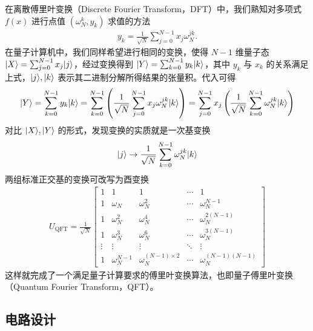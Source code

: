 \documentclass[a4paper,11pt,onecolumn,twoside]{article}
\begin{document}
在离散傅里叶变换（Discrete Fourier Transform，DFT）中，我们熟知对多项式 $f(x)$ 进行点值 $(\omega_N^k,y_k)$ 求值的方法 \begin{align}
    y_k=\frac{1}{\sqrt{N}}\sum_{j=0}^{N-1}x_j\omega_N^{jk}.
\end{align}
在量子计算机中，我们同样希望进行相同的变换，使得 $N-1$ 维量子态 $|X\rangle=\sum_{j=0}^{N-1}x_j|j\rangle$，经过变换得到 $|Y\rangle=\sum_{k=0}^{N-1}y_k|k\rangle$，其中 $y_k$ 与 $x_k$ 的关系满足上式，$|j\rangle,|k\rangle$ 表示其二进制分解所得结果的张量积。代入可得 \begin{align}
    |Y\rangle=\sum_{k=0}^{N-1}y_k|k\rangle=\sum_{k=0}^{N-1}\left(\frac{1}{\sqrt{N}}\sum_{j=0}^{N-1}x_j\omega_N^{jk}|k\rangle\right)=\sum_{j=0}^{N-1}x_j\left(\frac{1}{\sqrt{N}}\sum_{k=0}^{N-1}\omega_N^{jk}|k\rangle\right)
\end{align}
对比 $|X\rangle,|Y\rangle$ 的形式，发现变换的实质就是一次基变换 \begin{align}
    |j\rangle\to\frac{1}{\sqrt{N}}\sum_{k=0}^{N-1}\omega_N^{jk}|k\rangle\label{eq:qft-change-basis}
\end{align}
两组标准正交基的变换可改写为酉变换 \begin{align}
    U_{\text{QFT}} = \frac{1}{\sqrt{N}}
    \begin{bmatrix}
        1      & 1               & 1                         & \cdots & 1                      \\
        1      & \omega_N        & \omega_N ^{2}             & \cdots & \omega_N ^{N-1}        \\
        1      & \omega_N ^{2}   & \omega_N ^{4}             & \cdots & \omega_N ^{2(N-1)}     \\
        1      & \omega_N ^{3}   & \omega_N ^{6}             & \cdots & \omega_N ^{3(N-1)}     \\
        \vdots & \vdots          & \vdots                    & \ddots & \vdots                 \\
        1      & \omega_N ^{N-1} & \omega_N ^{(N-1)\times 2} & \cdots & \omega_N ^{(N-1)(N-1)}
    \end{bmatrix}
\end{align}
这样就完成了一个满足量子计算要求的傅里叶变换算法，也即量子傅里叶变换（Quantum Fourier Transform，QFT）。

\subsection{电路设计}
\end{document}
